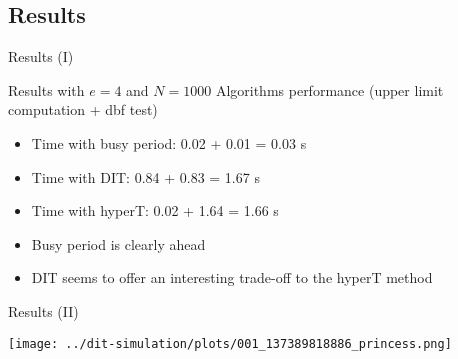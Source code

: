 \documentclass{beamer}
\begin{document}
\subsection{Results}

\begin{frame}{Results (I)}
    \begin{block}{Results with $e=4$ and $N=1000$}
    Algorithms performance (upper limit computation + dbf test)
    \begin{itemize}
    \item Time with busy period: 0.02 + 0.01  =  0.03 s
    \item Time with DIT: 0.84 + 0.83  =  1.67 s
    \item Time with hyperT: 0.02 + 1.64  =  1.66 s
    \end{itemize}
    \end{block}

    \begin{itemize}
      \item Busy period is clearly ahead
      \item DIT seems to offer an interesting trade-off to the hyperT method
    \end{itemize}
\end{frame}

\begin{frame}{Results (II)}
    \begin{center}
      \texttt{[image: ../dit-simulation/plots/001\_137389818886\_princess.png]}
    \end{center}
\end{frame}
\end{document}
